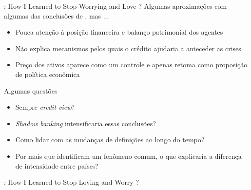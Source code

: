 \documentclass[presentation]{beamer}
\begin{document}
\begin{frame}[label={sec:org1189f44}]{\textcite{schularickCreditBoomsGone2012}: How I Learned to Stop Worrying and Love \textcite{minsky_1977_Financial}?}
Algumas aproximações com algumas das conclusões de \textcite{minsky_1977_Financial}, mas \(\ldots\)

\begin{itemize}
\item Pouca atenção à posição financeira e balanço patrimonial dos agentes
\item Não explica mecanismos pelos quais o crédito ajudaria a anteceder as crises
\item Preço dos ativos aparece como um controle e apenas retoma como proposição de política econômica
\end{itemize}

\begin{block}{Algumas questões}
\begin{itemize}
\item Sempre \emph{credit view}?
\item \emph{Shadow banking} intensificaria essas conclusões?
\item Como lidar com as mudanças de definições ao longo do tempo?
\item Por mais que identificam um fenômeno comum, o que explicaria a diferença de intensidade entre países?
\end{itemize}
\end{block}
\end{frame}

\begin{frame}[label={sec:org6935dfe}]{\textcite{sharpe_2020_Why}: How I Learned to Stop Loving and Worry \textcite{minsky_1977_Financial}?}
\end{frame}
\end{document}
